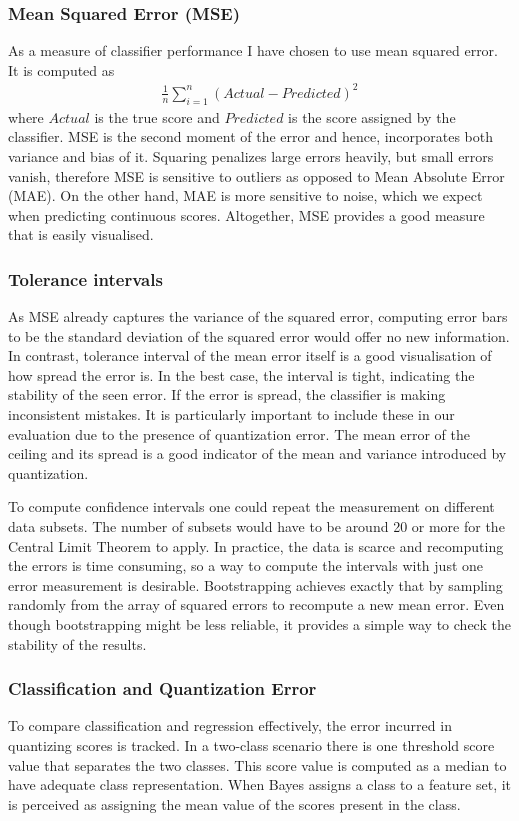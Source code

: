 \documentclass[12pt,notitlepage,twoside]{scrreprt}
\begin{document}
\subsubsection*{Mean Squared Error (MSE)}
As a measure of classifier performance I have chosen to use mean squared error.
It is computed as 
\begin{gather}
	\frac{1}{n}\sum_{i=1}^n(Actual-Predicted)^2
\end{gather}
where \(Actual\) is the true score and \(Predicted\) is the score assigned by the
classifier. MSE is the second moment of the error and hence, incorporates both variance
and bias of it. Squaring penalizes large errors heavily, but small errors vanish,
therefore MSE is sensitive to outliers as opposed to Mean Absolute Error (MAE). On the other
hand, MAE is more sensitive to noise, which we expect when predicting continuous scores.
Altogether, MSE provides a good measure that is easily visualised.
\subsubsection*{Tolerance intervals}
As MSE already captures the variance of the squared error, computing error bars to be the
standard deviation of the squared error would offer no new information. In contrast,
tolerance interval of the mean error itself is a good visualisation of how spread the
error is.  In the best case, the interval is tight, indicating the stability of the seen
error. If the error is spread, the classifier is making inconsistent mistakes.
It is particularly important to include these in our evaluation due to the presence of
quantization error. The mean error of the ceiling and its spread is a good indicator of
the mean and variance introduced by quantization.

To compute confidence intervals one could repeat the measurement on different data
subsets. The number of subsets would have to be around 20 or more for the Central Limit Theorem to
apply. In practice, the data is scarce and recomputing the errors is time consuming, so a
way to compute the intervals with just one error measurement is desirable. Bootstrapping
achieves exactly that by sampling randomly from the array of squared errors to recompute a
new mean error.  Even though bootstrapping might be less reliable, it provides a simple
way to check the stability of the results.
\subsubsection*{Classification and Quantization Error}
To compare classification and regression effectively, the error incurred in quantizing
scores is tracked. In a two-class scenario there is one threshold score value that
separates the two classes. This score value is computed as a median to have adequate class
representation. When Bayes assigns a class to a feature set, it is perceived as assigning
the mean value of the scores present in the class. 
\end{document}
